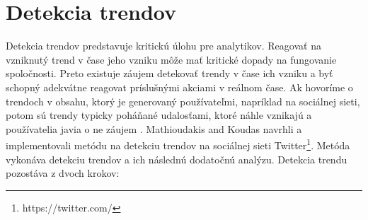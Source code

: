 \section{Detekcia trendov}
Detekcia trendov predstavuje kritickú úlohu pre analytikov. Reagovať na vzniknutý trend v čase jeho vzniku môže mať kritické dopady na fungovanie spoločnosti. Preto existuje záujem detekovať trendy v čase ich vzniku a byť schopný adekvátne reagovat príslušnými akciami v reálnom čase. Ak hovoríme o trendoch v obsahu, ktorý je generovaný používateľmi, napríklad na sociálnej sieti, potom sú trendy typicky poháňané udalosťami, ktoré náhle vznikajú a používatelia javia o ne záujem \citep{mathioudakis2010twittermonitor}. Mathioudakis and Koudas navrhli a implementovali metódu na detekciu trendov na sociálnej sieti Twitter\footnote{https://twitter.com/}. Metóda vykonáva detekciu trendov a ich následnú dodatočnú analýzu. Detekcia trendu pozostáva z dvoch krokov:
